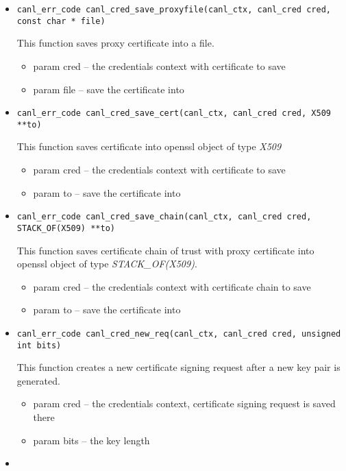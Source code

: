 \begin{itemize}
  \item \begin{verbatim}
canl_err_code canl_cred_save_proxyfile(canl_ctx, canl_cred cred,
const char * file)\end{verbatim}
  This function saves proxy certificate into a file.
  \begin{itemize}
    \item param cred -- the credentials context with certificate to save 
    \item param file -- save the certificate into 
  \end{itemize}
  \item \begin{verbatim}
canl_err_code canl_cred_save_cert(canl_ctx, canl_cred cred, X509 **to)\end{verbatim}
  This function saves certificate into openssl object of type \textit{X509}
  \begin{itemize}.
    \item param cred -- the credentials context with certificate to save
    \item param to -- save the certificate into
  \end{itemize}
  \item \begin{verbatim}
canl_err_code canl_cred_save_chain(canl_ctx, canl_cred cred, STACK_OF(X509) **to)\end{verbatim}
  This function saves certificate chain of trust with proxy 
  certificate into openssl object of type \textit{STACK\_OF(X509)}.
  \begin{itemize}
   \item param cred -- the credentials context with certificate chain to save
    \item param to -- save the certificate into
  \end{itemize}
  \item \begin{verbatim}
canl_err_code canl_cred_new_req(canl_ctx, canl_cred cred, unsigned int bits)\end{verbatim}
  This function creates a new certificate signing request after a new key pair 
  is generated.
   \begin{itemize}
    \item param cred -- the credentials context, certificate signing request 
    is saved there
    \item param bits -- the key length
  \end{itemize}
  \item \begin{verbatim}

\end{verbatim}
\end{itemize}
